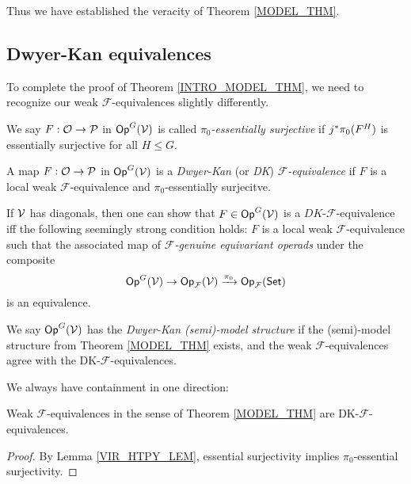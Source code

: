 \documentclass[a4paper,10pt
,draft
]{article}%
\renewcommand{\F}{\mathcal F}
\renewcommand{\1}{\eta}%
\begin{document}
Thus we have established the veracity of Theorem \ref{MODEL_THM}.













\subsection{Dwyer-Kan equivalences}
\label{DK_SEC}

To complete the proof of Theorem \ref{INTRO_MODEL_THM}, 
we need to recognize our weak $\F$-equivalences slightly differently.

\begin{definition}
      We say $F: \mathcal{O} \to \mathcal{P}$ in $\mathsf{Op}^G(\mathcal V)$ is called \textit{$\pi_0$-essentially surjective} if
      $j^{\**}\pi_0(F^H)$ is essentially surjective for all $H \leq G$.
      
      A map $F: \mathcal{O} \to \mathcal{P}$ in $\mathsf{Op}^G(\mathcal V)$ is a \textit{Dwyer-Kan} (or \textit{DK}) \textit{$\F$-equivalence} if
      $F$ is a local weak $\F$-equivalence and $\pi_0$-essentially surjecitve.
\end{definition}

\begin{remark}
      If $\mathcal V$ has diagonals, then one can show that $F \in \mathsf{Op}^G(\mathcal V)$ is a $DK$-$\F$-equivalence iff
      the following seemingly strong condition holds:
      $F$ is a local weak $\F$-equivalence such that 
      the associated map of \textit{$\F$-genuine equivariant operads} under the composite
      \begin{equation}
            \Op^G(\V) \to \Op_\F(\V) \xrightarrow{\pi_0} \Op_\F(\Set) 
      \end{equation}
      is an equivalence.
\end{remark}

\begin{definition}
      \label{DK_MODEL_DEF}
      We say $\mathsf{Op}^G(\mathcal V)$ has the \textit{Dwyer-Kan (semi)-model structure} if the (semi)-model structure from
      Theorem \ref{MODEL_THM} exists, and the weak $\F$-equivalences agree with the DK-$\F$-equivalences.
\end{definition}

We always have containment in one direction:
\begin{proposition}
      \label{WE_ARE_DK_PROP}
      Weak $\F$-equivalences in the sense of Theorem \ref{MODEL_THM} are DK-$\F$-equivalences.
\end{proposition}
\begin{proof}
      By Lemma \ref{VIR_HTPY_LEM}, essential surjectivity implies $\pi_0$-essential surjectivity. 
\end{proof}
\end{document}
